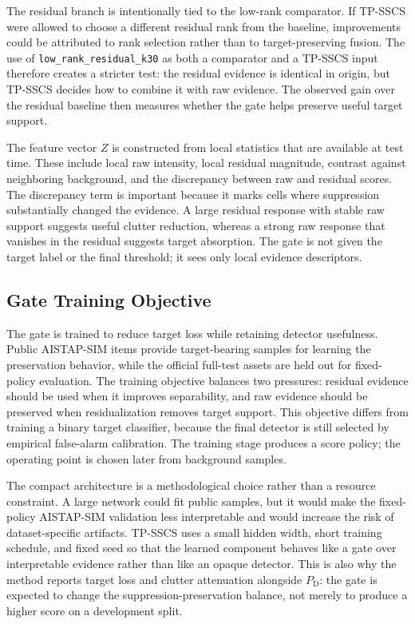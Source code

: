 \documentclass[journal]{IEEEtran}
\begin{document}
The residual branch is intentionally tied to the low-rank comparator. If TP-SSCS were allowed to choose a different residual rank from the baseline, improvements could be attributed to rank selection rather than to target-preserving fusion. The use of \texttt{low\_rank\_residual\_k30} as both a comparator and a TP-SSCS input therefore creates a stricter test: the residual evidence is identical in origin, but TP-SSCS decides how to combine it with raw evidence. The observed gain over the residual baseline then measures whether the gate helps preserve useful target support.

The feature vector $Z$ is constructed from local statistics that are available at test time. These include local raw intensity, local residual magnitude, contrast against neighboring background, and the discrepancy between raw and residual scores. The discrepancy term is important because it marks cells where suppression substantially changed the evidence. A large residual response with stable raw support suggests useful clutter reduction, whereas a strong raw response that vanishes in the residual suggests target absorption. The gate is not given the target label or the final threshold; it sees only local evidence descriptors.

\subsection{Gate Training Objective}

The gate is trained to reduce target loss while retaining detector usefulness. Public AISTAP-SIM items provide target-bearing samples for learning the preservation behavior, while the official full-test assets are held out for fixed-policy evaluation. The training objective balances two pressures: residual evidence should be used when it improves separability, and raw evidence should be preserved when residualization removes target support. This objective differs from training a binary target classifier, because the final detector is still selected by empirical false-alarm calibration. The training stage produces a score policy; the operating point is chosen later from background samples.

The compact architecture is a methodological choice rather than a resource constraint. A large network could fit public samples, but it would make the fixed-policy AISTAP-SIM validation less interpretable and would increase the risk of dataset-specific artifacts. TP-SSCS uses a small hidden width, short training schedule, and fixed seed so that the learned component behaves like a gate over interpretable evidence rather than like an opaque detector. This is also why the method reports target loss and clutter attenuation alongside $P_{\mathrm{D}}$: the gate is expected to change the suppression-preservation balance, not merely to produce a higher score on a development split.
\end{document}
